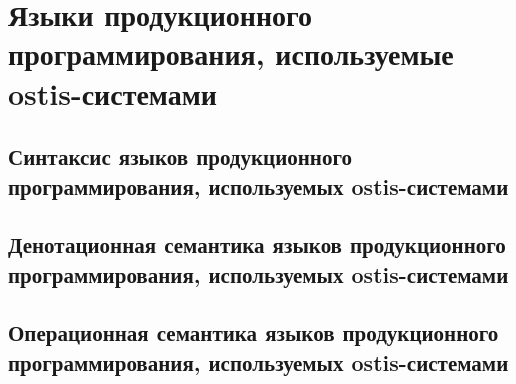 
\section{Языки продукционного программирования, используемые ostis-системами}
\subsection{Синтаксис языков продукционного программирования, используемых ostis-системами}
\subsection{Денотационная семантика языков продукционного программирования, используемых ostis-системами}
\subsection{Операционная семантика языков продукционного программирования, используемых ostis-системами}

%